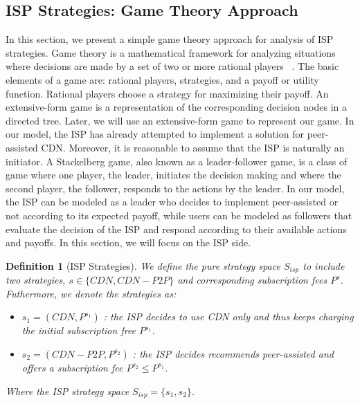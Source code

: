 \documentclass[paper]{ieice}
\begin{document}
\subsection{ISP Strategies: Game Theory Approach}

In this section, we present a simple game theory approach for analysis
of ISP strategies.  Game theory is a mathematical framework for
analyzing situations where decisions are made by a set of two or more
rational players~ \cite{gametheory}.  The basic elements of a game
are: rational players, strategies, and a payoff or utility function.
Rational players choose a strategy for maximizing their payoff.  An
extensive-form game is a representation of the corresponding decision
nodes in a directed tree.  Later, we will use an extensive-form game
to represent our game.  In our model, the ISP has already attempted to
implement a solution for peer-assisted CDN.  Moreover, it is
reasonable to assume that the ISP is naturally an initiator.  A
Stackelberg game, also known as a leader-follower game, is a class of
game where one player, the leader, initiates the decision making and
where the second player, the follower, responds to the actions by the
leader.  In our model, the ISP can be modeled as a leader who decides
to implement peer-assisted or not according to its expected payoff,
while users can be modeled as followers that evaluate the decision of
the ISP and respond according to their available actions and payoffs.
In this section, we will focus on the ISP side.

\newtheorem{theorem}{Definition}
\begin{theorem}[ISP Strategies]
We define the pure strategy space $S_{isp}$ to include two strategies, $s \in \{CDN, CDN-P2P\}$ and corresponding subscription fees $P^{s}$.
Futhermore, we denote the strategies as:
\begin{itemize}
	\item $s_1 = (CDN, P^{s_1})$ : the ISP decides to use CDN only and thus keeps charging the initial subscription free $P^{s_1}$.
	\item $s_2 = (CDN-P2P, P^{s_2})$ : the ISP decides recommends peer-assisted and offers a subscription fee $P^{s_2} \le P^{s_1}$.
\end{itemize}
Where the ISP strategy space $S_{isp} = \{s_1,s_2\}$.
\end{theorem}
\end{document}

